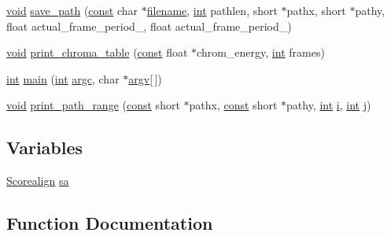 \begin{DoxyCompactItemize}
\item 
\hyperlink{sound_8c_ae35f5844602719cf66324f4de2a658b3}{void} \hyperlink{lib-src_2libscorealign_2main_8cpp_a68b0155f4a61a1261614714abd27dab0}{save\+\_\+path} (\hyperlink{getopt1_8c_a2c212835823e3c54a8ab6d95c652660e}{const} char $\ast$\hyperlink{test__portburn_8cpp_a7efa5e9c7494c7d4586359300221aa5d}{filename}, \hyperlink{xmltok_8h_a5a0d4a5641ce434f1d23533f2b2e6653}{int} pathlen, short $\ast$pathx, short $\ast$pathy, float actual\+\_\+frame\+\_\+period\+\_, float actual\+\_\+frame\+\_\+period\+\_)
\item 
\hyperlink{sound_8c_ae35f5844602719cf66324f4de2a658b3}{void} \hyperlink{lib-src_2libscorealign_2main_8cpp_a4c70cd48d529ccaad182022ec8ac262e}{print\+\_\+chroma\+\_\+table} (\hyperlink{getopt1_8c_a2c212835823e3c54a8ab6d95c652660e}{const} float $\ast$chrom\+\_\+energy, \hyperlink{xmltok_8h_a5a0d4a5641ce434f1d23533f2b2e6653}{int} frames)
\item 
\hyperlink{xmltok_8h_a5a0d4a5641ce434f1d23533f2b2e6653}{int} \hyperlink{lib-src_2libscorealign_2main_8cpp_a0ddf1224851353fc92bfbff6f499fa97}{main} (\hyperlink{xmltok_8h_a5a0d4a5641ce434f1d23533f2b2e6653}{int} \hyperlink{cmdline_8c_aaffeb1bf2056ea44af5b5d0ee4d6ff07}{argc}, char $\ast$\hyperlink{cmdline_8c_ad407d5ba91709bd9b092003858600723}{argv}\mbox{[}$\,$\mbox{]})
\item 
\hyperlink{sound_8c_ae35f5844602719cf66324f4de2a658b3}{void} \hyperlink{lib-src_2libscorealign_2main_8cpp_af8df65564a341b00b420df5d6c970a61}{print\+\_\+path\+\_\+range} (\hyperlink{getopt1_8c_a2c212835823e3c54a8ab6d95c652660e}{const} short $\ast$pathx, \hyperlink{getopt1_8c_a2c212835823e3c54a8ab6d95c652660e}{const} short $\ast$pathy, \hyperlink{xmltok_8h_a5a0d4a5641ce434f1d23533f2b2e6653}{int} \hyperlink{checksum_8c_ab80e330a3bc9e38c1297fe17381e92b4}{i}, \hyperlink{xmltok_8h_a5a0d4a5641ce434f1d23533f2b2e6653}{int} j)
\end{DoxyCompactItemize}
\subsection*{Variables}
\begin{DoxyCompactItemize}
\item 
\hyperlink{class_scorealign}{Scorealign} \hyperlink{lib-src_2libscorealign_2main_8cpp_a1aa9083626d69f94349750d974f0359a}{sa}
\end{DoxyCompactItemize}


\subsection{Function Documentation}
